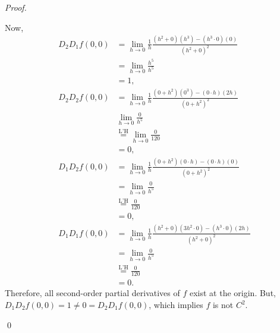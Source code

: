 \documentclass[12pt]{article}
\newenvironment{sol}
    {\emph{Proof.}
    }
    {
    \qed
    }
\begin{document}
\begin{sol}
     Now, \begin{align*}
         D_2D_1f(0,0) &= \lim_{h \to 0} \frac{1}{h}\frac{(h^2 + 0)(h^3) - (h^3 \cdot 0)(0)}{(h^2 + 0)^2} \\ &= \lim_{h \to 0} \frac{h^5}{h^5} \\ &= 1, \\ 
         D_2D_2f(0,0) &= \lim_{h \to 0} \frac{1}{h}\frac{(0 + h^2)(0^3) - (0 \cdot h)(2h)}{(0 + h^2)^2} \\ &\lim_{h \to 0} \frac{0}{h^5} \\ &\stackrel{\text{L'H}}{=} \lim_{h \to 0}
         \frac{0}{120} \\ &= 0, \\
         D_1D_2f(0,0) &= \lim_{h \to 0} \frac{1}{h}\frac{(0 + h^2)(0 \cdot h) - (0 \cdot h)(0)}{(0 + h^2)^2} \\ &= \lim_{h \to 0} \frac{0}{h^5} \\ &\stackrel{\text{L'H}}{=} \frac{0}{120} \\ &= 0, \\
         D_1D_1f(0,0) &= \lim_{h \to 0} \frac{1}{h}\frac{(h^2 + 0)(3h^2 \cdot 0) - (h^3 \cdot 0)(2h)}{(h^2 + 0)^2} \\ &= \lim_{h \to 0} \frac{0}{h^5} \\ &\stackrel{\text{L'H}}{=} \frac{0}{120} \\ &= 0.
     \end{align*}
     Therefore, all second-order partial derivatives of $f$ exist at the origin. But, $D_1D_2f(0,0) = 1 \neq 0 = D_2D_1f(0,0)$, which implies $f$ is not $C^2$. 
     
  \end{sol}
  
\end{document}
